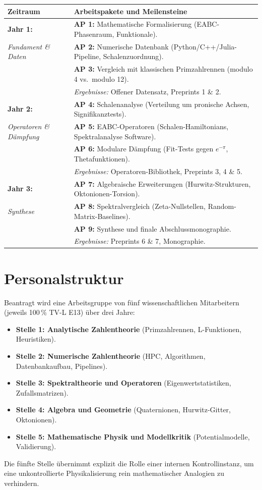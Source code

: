 \documentclass[11pt,a4paper,bibliography=totoc]{scrartcl}
\begin{document}
	\noindent\begin{tabular}{p{} p{}}
		\toprule
		\textbf{Zeitraum} & \textbf{Arbeitspakete und Meilensteine} \\
		\midrule
		\textbf{Jahr 1:} & \textbf{AP 1:} Mathematische Formalisierung (EABC-Phasenraum, Funktionale). \\
		\emph{Fundament \& Daten} & \textbf{AP 2:} Numerische Datenbank (Python/C++/Julia-Pipeline, Schalenzuordnung). \\
		& \textbf{AP 3:} Vergleich mit klassischen Primzahlrennen (modulo 4 vs.\ modulo 12). \\
		& \emph{Ergebnisse:} Offener Datensatz, Preprints 1 \& 2. \\
		\midrule
		\textbf{Jahr 2:} & \textbf{AP 4:} Schalenanalyse (Verteilung um pronische Achsen, Signifikanztests). \\
		\emph{Operatoren \& Dämpfung} & \textbf{AP 5:} EABC-Operatoren (Schalen-Hamiltonians, Spektralanalyse Software). \\
		& \textbf{AP 6:} Modulare Dämpfung (Fit-Tests gegen $e^{-\pi}$, Thetafunktionen). \\
		& \emph{Ergebnisse:} Operatoren-Bibliothek, Preprints 3, 4 \& 5. \\
		\midrule
		\textbf{Jahr 3:} & \textbf{AP 7:} Algebraische Erweiterungen (Hurwitz-Strukturen, Oktonionen-Torsion). \\
		\emph{Synthese}  & \textbf{AP 8:} Spektralvergleich (Zeta-Nullstellen, Random-Matrix-Baselines). \\
		& \textbf{AP 9:} Synthese und finale Abschlussmonographie. \\
		& \emph{Ergebnisse:} Preprints 6 \& 7, Monographie. \\
		\bottomrule
	\end{tabular}
	
	\section{Personalstruktur}
	Beantragt wird eine Arbeitsgruppe von fünf wissenschaftlichen Mitarbeitern (jeweils 100\,\% TV-L E13) über drei Jahre:
	\begin{itemize}
		\item \textbf{Stelle 1: Analytische Zahlentheorie} (Primzahlrennen, L-Funktionen, Heuristiken).
		\item \textbf{Stelle 2: Numerische Zahlentheorie} (HPC, Algorithmen, Datenbankaufbau, Pipelines).
		\item \textbf{Stelle 3: Spektraltheorie und Operatoren} (Eigenwertstatistiken, Zufallsmatrizen).
		\item \textbf{Stelle 4: Algebra und Geometrie} (Quaternionen, Hurwitz-Gitter, Oktonionen).
		\item \textbf{Stelle 5: Mathematische Physik und Modellkritik} (Potentialmodelle, Validierung).
	\end{itemize}
	Die fünfte Stelle übernimmt explizit die Rolle einer internen Kontrollinstanz, um eine unkontrollierte Physikalisierung rein mathematischer Analogien zu verhindern.
	
\end{document}
